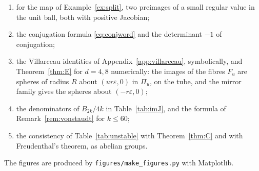 \begin{enumerate}[label=(\arabic*)]
\item for the map of Example~\ref{ex:split}, two preimages of a small regular value in the unit ball, both with positive Jacobian;
\item the conjugation formula \eqref{eq:conjword} and the determinant $-1$ of conjugation;
\item the Villarceau identities of Appendix~\ref{app:villarceau}, symbolically, and Theorem~\ref{thm:E} for $d=4,8$ numerically: the images of the fibres $F_u$ are spheres of radius $R$ about $(ur\varepsilon,0)$ in $\Pi_u$, on the tube, and the mirror family gives the spheres about $(-r\varepsilon,0)$;
\item the denominators of $B_{2k}/4k$ in Table~\ref{tab:imJ}, and the formula of Remark~\ref{rem:vonstaudt} for $k\le60$;
\item the consistency of Table~\ref{tab:unstable} with Theorem~\ref{thm:C} and with Freudenthal's theorem, as abelian groups.
\end{enumerate}
The figures are produced by \texttt{figures/make\_figures.py} with Matplotlib.
